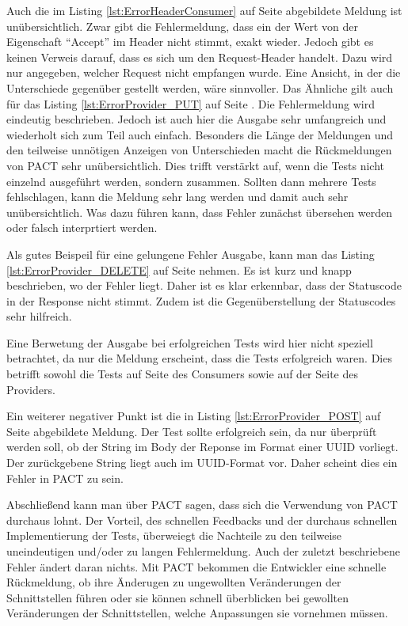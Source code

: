 \documentclass{llncs}
\begin{document}
Auch die im Listing \ref{lst:ErrorHeaderConsumer} auf Seite \pageref{lst:ErrorHeaderConsumer} abgebildete Meldung ist unübersichtlich. Zwar gibt die Fehlermeldung, dass ein der Wert von der Eigenschaft \enquote{Accept} im Header nicht stimmt, exakt wieder. Jedoch gibt es keinen Verweis darauf, dass es sich um den Request-Header handelt. Dazu wird nur angegeben, welcher Request nicht empfangen wurde. Eine Ansicht, in der die Unterschiede gegenüber gestellt werden, wäre sinnvoller.
Das Ähnliche gilt auch für das Listing \ref{lst:ErrorProvider_PUT} auf Seite \pageref{lst:ErrorProvider_PUT}. Die Fehlermeldung wird eindeutig beschrieben. Jedoch ist auch hier die Ausgabe sehr umfangreich und wiederholt sich zum Teil auch einfach. Besonders die Länge der Meldungen und den teilweise unnötigen Anzeigen von Unterschieden macht die Rückmeldungen von PACT sehr unübersichtlich. Dies trifft verstärkt auf, wenn die Tests nicht einzelnd ausgeführt werden, sondern zusammen. Sollten dann mehrere Tests fehlschlagen, kann die Meldung sehr lang werden und damit auch sehr  unübersichtlich. Was dazu führen kann, dass Fehler zunächst übersehen werden oder falsch interprtiert werden.

Als gutes Beispeil für eine gelungene Fehler Ausgabe, kann man das Listing \ref{lst:ErrorProvider_DELETE} auf Seite \pageref{lst:ErrorProvider_DELETE} nehmen. Es ist kurz und knapp beschrieben, wo der Fehler liegt. Daher ist es klar erkennbar, dass der Statuscode in der Response nicht stimmt. Zudem ist die Gegenüberstellung der Statuscodes sehr hilfreich.

Eine Berwetung der Ausgabe bei erfolgreichen Tests wird hier nicht speziell betrachtet, da nur die Meldung erscheint, dass die Tests erfolgreich waren. Dies betrifft sowohl die Tests auf Seite des Consumers sowie auf der Seite des Providers.

Ein weiterer negativer Punkt ist die in Listing \ref{lst:ErrorProvider_POST} auf Seite \pageref{lst:ErrorProvider_POST} abgebildete Meldung. Der Test sollte erfolgreich sein, da nur überprüft werden soll, ob der String im Body der Reponse im Format einer UUID vorliegt. Der zurückgebene String liegt auch im UUID-Format vor. Daher scheint dies ein Fehler in PACT zu sein. 

Abschließend kann man über PACT sagen, dass sich die Verwendung von PACT durchaus lohnt. Der Vorteil, des schnellen Feedbacks und der durchaus schnellen Implementierung der Tests, überweiegt die Nachteile zu den teilweise uneindeutigen und/oder zu langen Fehlermeldung. Auch der zuletzt beschriebene Fehler ändert daran nichts. Mit PACT bekommen die Entwickler eine schnelle Rückmeldung, ob ihre Änderugen zu ungewollten Veränderungen der Schnittstellen führen oder sie können schnell überblicken bei gewollten Veränderungen der Schnittstellen, welche Anpassungen sie vornehmen müssen.
\end{document}
